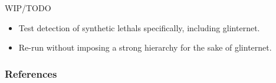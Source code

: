 \begin{frame}{WIP/TODO}
\begin{itemize}
	\item Test detection of synthetic lethals specifically, including glinternet.
	\item Re-run without imposing a strong hierarchy for the sake of glinternet.
\end{itemize}
\end{frame}

\begin{frame}
\frametitle{References}
\printbibliography
\end{frame}




